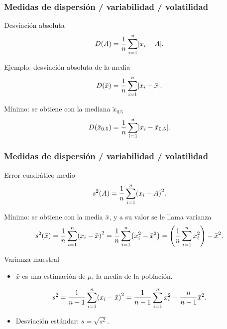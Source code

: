 \documentclass[table]{beamer}
\begin{document}
\begin{frame}
    \frametitle{Medidas de dispersión / variabilidad / volatilidad}
    \begin{block}{Desviación absoluta}
        \begin{equation*}
            D \parens{A} = \frac{1}{n} \sum_{i = 1}^{n} \vparens{x_{i} - A} .
        \end{equation*}
    \end{block}
    \begin{exampleblock}{Ejemplo: desviación absoluta de la media}
        \begin{equation*}
            D \parens{\bar{x}} = \frac{1}{n} \sum_{i = 1}^{n} \vparens{x_{i} - \bar{x}} .
        \end{equation*}
    \end{exampleblock}
    \begin{block}{Mínimo: se obtiene con la mediana $\tilde{x}_{0.5}$}
        \begin{equation*}
            D \parens{\tilde{x}_{0.5}} = \frac{1}{n} \sum_{i = 1}^{n} \vparens{x_{i} - \tilde{x}_{0.5}} .
        \end{equation*}
    \end{block}
\end{frame}

\begin{frame}
    \frametitle{Medidas de dispersión / variabilidad / volatilidad}
    \begin{block}{Error cuadrático medio}
        \begin{equation*}
            s^{2} \parens{A} = \frac{1}{n} \sum_{i = 1}^{n} \parens{x_{i} - A}^{2} .
        \end{equation*}
    \end{block}
    \begin{block}{Mínimo: se obtiene con la media $\bar{x}$, y a su valor se le llama varianza}
        \begin{equation*}
            s^{2} \parens{\bar{x}} = \frac{1}{n} \sum_{i = 1}^{n} \parens{x_{i} - \bar{x}}^{2}
            = \frac{1}{n} \sum_{i = 1}^{n} \parens{x_{i}^{2} - \bar{x}^{2}}
            = \parens{\frac{1}{n} \sum_{i = 1}^{n} x_{i}^{2}} - \bar{x}^{2} .
        \end{equation*}
    \end{block}
    \begin{block}{Varianza muestral}
        \begin{itemize}
            \item $\bar{x}$ es una estimación de $\mu$, la media de la población.
        \end{itemize}
        \begin{equation*}
            s^{2} = \frac{1}{n - 1} \sum_{i = 1}^{n} \parens{x_{i} - \bar{x}}^{2}
            = \frac{1}{n - 1} \sum_{i = 1}^{n} x_{i}^{2} - \frac{n}{n - 1} \bar{x}^{2} .
        \end{equation*}
        \begin{itemize}
            \item Desviación estándar: $s = \sqrt{s^{2}}$.
        \end{itemize}
    \end{block}
\end{frame}
\end{document}
